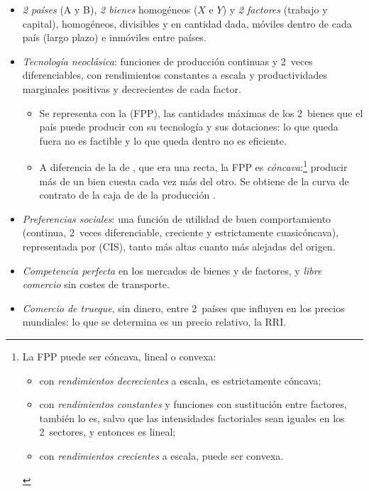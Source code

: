 \documentclass[11pt]{article}
\begin{document}
\begin{itemize}
\item \emph{2 países} (A y B), \emph{2 bienes} homogéneos ($X$ e $Y$) y \emph{2 factores} (trabajo y capital), homogéneos, divisibles y en cantidad dada, móviles dentro de cada país (largo plazo) e inmóviles entre países.
\item \emph{Tecnología neoclásica}: funciones de producción continuas y 2~veces diferenciables, con rendimientos constantes a escala y productividades marginales positivas y decrecientes de cada factor.
  \begin{itemize}
  \item Se representa con la  (FPP), las cantidades máximas de los 2~bienes que el país puede producir con su tecnología y sus dotaciones: lo que queda fuera no es factible y lo que queda dentro no es eficiente.
  \item A diferencia de la de , que era una recta, la FPP es \emph{cóncava}:\footnote{La FPP puede ser cóncava, lineal o convexa:
\begin{itemize}
\item con \emph{rendimientos decrecientes} a escala, es estrictamente cóncava;
\item con \emph{rendimientos constantes} y funciones con sustitución entre factores, también lo es, salvo que las intensidades factoriales sean iguales en los 2~sectores, y entonces es lineal;
\item con \emph{rendimientos crecientes} a escala, puede ser convexa.
\end{itemize}} producir más de un bien cuesta cada vez más del otro. Se obtiene de la curva de contrato de la caja de  de la producción  .
  \end{itemize}
\item \emph{Preferencias sociales}: una función de utilidad de buen comportamiento (continua, 2~veces diferenciable, creciente y estrictamente cuasicóncava), representada por  (CIS), tanto más altas cuanto más alejadas del origen.
\item \emph{Competencia perfecta} en los mercados de bienes y de factores, y \emph{libre comercio} sin costes de transporte.
\item \emph{Comercio de trueque}, sin dinero, entre 2~países que influyen en los precios mundiales: lo que se determina es un precio relativo, la RRI.
\end{itemize}
\end{document}
